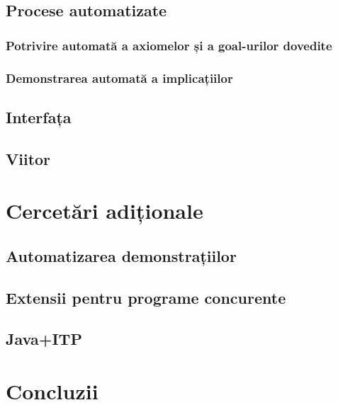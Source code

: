 \documentclass[12pt,a4paper]{article}
\begin{document}
\subsection{Procese automatizate}
\subsubsection{Potrivire automată a axiomelor și a goal-urilor dovedite}
\subsubsection{Demonstrarea automată a implicațiilor}
\subsection{Interfața}
\subsection{Viitor}
\section{Cercetări adiționale}
\subsection{Automatizarea demonstrațiilor}
\subsection{Extensii pentru programe concurente}
\subsection{Java+ITP}

\section{Concluzii}
\end{document}
